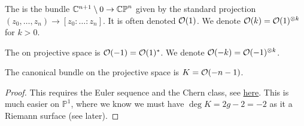 \documentclass{article}
\begin{document}
\subsubsection{}

\begin{definition}
The  is the bundle $\mathbb{C}^{n+1}\setminus 0 \to \mathbb{CP}^n$ given by the standard projection $(z_0, \dots, z_n) \to [z_0: \dots : z_n]$. It is often denoted $\mathcal{O}(1)$.  We denote $\mathcal{O}(k) = \mathcal{O}(1)^{\otimes k}$ for $k>0$.
\end{definition}

\begin{definition}
The  on projective space is $\mathcal{O}(-1) = \mathcal{O}(1)^\ast$. We denote $\mathcal{O}(-k) = \mathcal{O}(-1)^{\otimes k}$. 
\end{definition}

\begin{prop}
The canonical bundle on the projective space is $K = \mathcal{O}(-n-1)$. 
\end{prop}
\begin{proof}
	This requires the Euler sequence and the Chern class, see \href{https://mathoverflow.net/questions/176639/canonical-sheaf-of-projective-space}{here}. This is much easier on $\mathbb{P}^1$, where we know we must have $\deg K = 2g-2 = -2$ as it a Riemann surface (see later).  
\end{proof}
\end{document}
